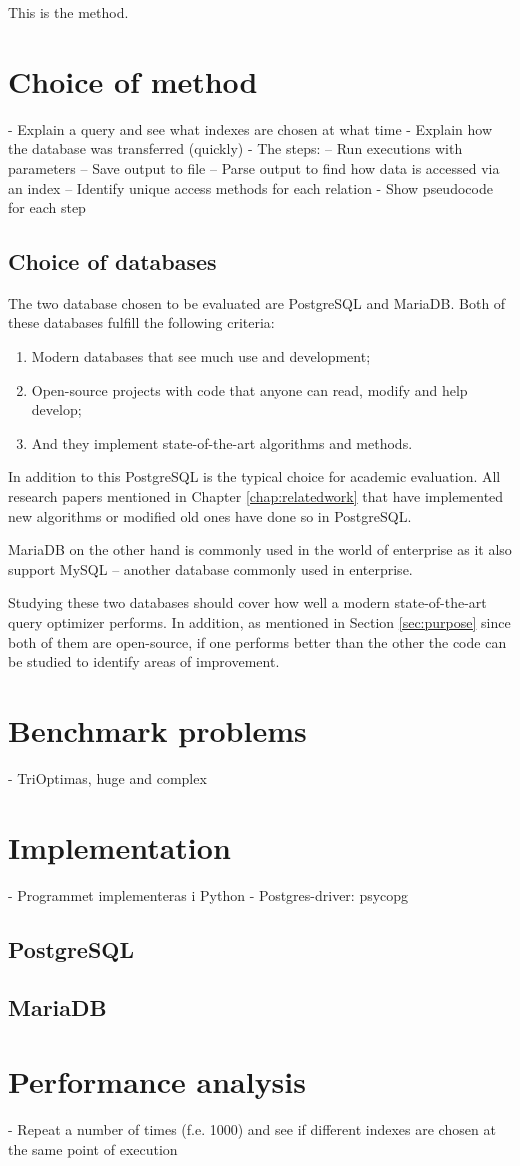 This is the method.

\section{Choice of method} \label{sec:choiceofmethod}
- Explain a query and see what indexes are chosen at what time
- Explain how the database was transferred (quickly)
- The steps:
-- Run executions with parameters
-- Save output to file
-- Parse output to find how data is accessed via an index
-- Identify unique access methods for each relation
- Show pseudocode for each step

\subsection{Choice of databases} \label{sec:choiceofdatabases}
The two database chosen to be evaluated are PostgreSQL and MariaDB. Both of these databases fulfill the following criteria:
\begin{enumerate}
    \item Modern databases that see much use and development;
    \item Open-source projects with code that anyone can read, modify and help develop;
    \item And they implement state-of-the-art algorithms and methods.
\end{enumerate}

In addition to this PostgreSQL is the typical choice for academic evaluation. All research papers mentioned in Chapter \ref{chap:relatedwork} that have implemented new algorithms or modified old ones have done so in PostgreSQL.

MariaDB on the other hand is commonly used in the world of enterprise as it also support MySQL – another database commonly used in enterprise.

Studying these two databases should cover how well a modern state-of-the-art query optimizer performs. In addition, as mentioned in Section \ref{sec:purpose} since both of them are open-source, if one performs better than the other the code can be studied to identify areas of improvement.

\section{Benchmark problems} \label{sec:benchmark}
- TriOptimas, huge and complex

\section{Implementation}
- Programmet implementeras i Python
- Postgres-driver: psycopg

\subsection{PostgreSQL}

\subsection{MariaDB}

\section{Performance analysis}
- Repeat a number of times (f.e.  1000) and see if different indexes are chosen at the same point of execution